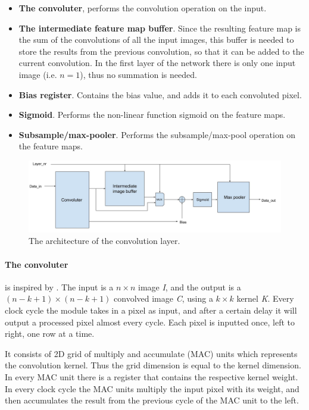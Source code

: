 \begin{itemize}
	\item \textbf{The convoluter}, performs the convolution operation on the input.
	\item \textbf{The intermediate feature map buffer}. Since the resulting feature map is the sum of the convolutions of all the input images, this buffer is needed to store the results from the previous convolution, so that it can be added to the current convolution. In the first layer of the network there is only one input image (i.e. $ n = 1 $), thus no summation is needed.
	\item \textbf{Bias register}. Contains the bias value, and adds it to each convoluted pixel. 
	\item \textbf{Sigmoid}. Performs the non-linear function sigmoid on the feature maps.
	\item \textbf{Subsample/max-pooler}. Performs the subsample/max-pool operation on the feature maps. 
\end{itemize}

\begin{figure}[h!]
  \centering
      \includegraphics[width=1.0\textwidth]{Figures/Method/conv_layer_arch}
  \caption{The architecture of the convolution layer.}
\end{figure}


\paragraph{The convoluter} is inspired by \cite{Farabet2009}. The input is a $ n \times n $ image \textit{I}, and the output is a $ (n-k+1) \times (n-k+1) $ convolved image \textit{C}, using a $ k \times k $ kernel \textit{K}. Every clock cycle the module takes in a pixel as input, and after a certain delay it will output a processed pixel almost every cycle. Each pixel is inputted once, left to right, one row at a time. 

It consists of 2D grid of multiply and accumulate (MAC) units which represents the convolution kernel. Thus the grid dimension is equal to the kernel dimension. In every MAC unit there is a register that contains the respective kernel weight. In every clock cycle the MAC units multiply the input pixel with its weight, and then accumulates the result from the previous cycle of the MAC unit to the left. 

